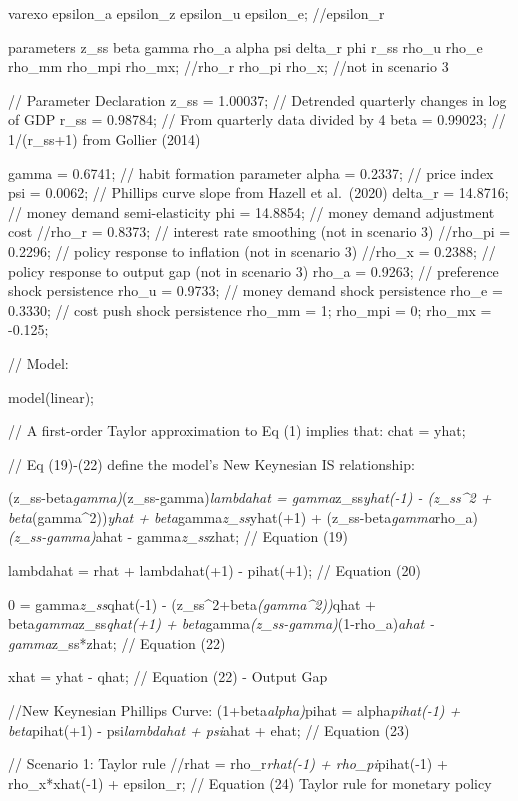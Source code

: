 \documentclass[11pt,preprint, authoryear]{elsarticle}
\numberwithin{equation}{section}
\numberwithin{figure}{section}
\numberwithin{table}{section}
\begin{document}
varexo epsilon\_a epsilon\_z epsilon\_u epsilon\_e; //epsilon\_r

parameters z\_ss beta gamma rho\_a alpha psi delta\_r phi r\_ss rho\_u
rho\_e rho\_mm rho\_mpi rho\_mx; //rho\_r rho\_pi rho\_x; //not in
scenario 3

// Parameter Declaration z\_ss = 1.00037; // Detrended quarterly changes
in log of GDP r\_ss = 0.98784; // From quarterly data divided by 4 beta
= 0.99023; // 1/(r\_ss+1) from Gollier (2014)

gamma = 0.6741; // habit formation parameter alpha = 0.2337; // price
index psi = 0.0062; // Phillips curve slope from Hazell et al.~(2020)
delta\_r = 14.8716; // money demand semi-elasticity phi = 14.8854; //
money demand adjustment cost //rho\_r = 0.8373; // interest rate
smoothing (not in scenario 3) //rho\_pi = 0.2296; // policy response to
inflation (not in scenario 3) //rho\_x = 0.2388; // policy response to
output gap (not in scenario 3) rho\_a = 0.9263; // preference shock
persistence rho\_u = 0.9733; // money demand shock persistence rho\_e =
0.3330; // cost push shock persistence rho\_mm = 1; rho\_mpi = 0;
rho\_mx = -0.125;

// Model:

model(linear);

// A first-order Taylor approximation to Eq (1) implies that: chat =
yhat;

// Eq (19)-(22) define the model's New Keynesian IS relationship:

(z\_ss-beta\emph{gamma)}(z\_ss-gamma)\emph{lambdahat =
gamma}z\_ss\emph{yhat(-1) - (z\_ss\^{}2 + beta}(gamma\^{}2))\emph{yhat +
beta}gamma\emph{z\_ss}yhat(+1) +
(z\_ss-beta\emph{gamma}rho\_a)\emph{(z\_ss-gamma)}ahat -
gamma\emph{z\_ss}zhat; // Equation (19)

lambdahat = rhat + lambdahat(+1) - pihat(+1); // Equation (20)

0 = gamma\emph{z\_ss}qhat(-1) - (z\_ss\^{}2+beta\emph{(gamma\^{}2))}qhat
+ beta\emph{gamma}z\_ss\emph{qhat(+1) +
beta}gamma\emph{(z\_ss-gamma)}(1-rho\_a)\emph{ahat - gamma}z\_ss*zhat;
// Equation (22)

xhat = yhat - qhat; // Equation (22) - Output Gap

//New Keynesian Phillips Curve: (1+beta\emph{alpha)}pihat =
alpha\emph{pihat(-1) + beta}pihat(+1) - psi\emph{lambdahat + psi}ahat +
ehat; // Equation (23)

// Scenario 1: Taylor rule //rhat = rho\_r\emph{rhat(-1) +
rho\_pi}pihat(-1) + rho\_x*xhat(-1) + epsilon\_r; // Equation (24)
Taylor rule for monetary policy
\end{document}
